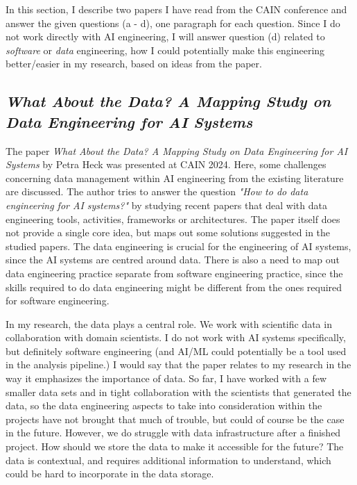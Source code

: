 \documentclass[11pt]{article}
\begin{document}
In this section, I describe two papers I have read from the CAIN conference and answer the given questions (a - d), one paragraph for each question. 
Since I do not work directly with AI engineering, I will answer question (d) related to \emph{software} or \emph{data} engineering, how I could potentially make this engineering better/easier in my research, based on ideas from the paper. 

\subsection{\textit{What About the Data? A Mapping Study on Data Engineering for AI Systems}}

The paper \textit{What About the Data? A Mapping Study on Data Engineering for AI Systems} by Petra Heck \cite{heck_what_about_the_data} was presented at CAIN 2024. Here, some challenges concerning data management within AI engineering from the existing literature are discussed. The author tries to answer the question \textit{"How to do data engineering for AI systems?"} by studying recent papers that deal with data engineering tools, activities, frameworks or architectures.
The paper itself does not provide a single core idea, but maps out some solutions suggested in the studied papers. 
The data engineering is crucial for the engineering of AI systems, since the AI systems are centred around data. 
There is also a need to map out data engineering practice separate from software engineering practice, since the skills required to do data engineering might be different from the ones required for software engineering.


In my research, the data plays a central role. We work with scientific data in collaboration with domain scientists. I do not work with AI systems specifically, but definitely software engineering (and AI/ML could potentially be a tool used in the analysis pipeline.)
I would say that the paper relates to my research in the way it emphasizes the importance of data. 
So far, I have worked with a few smaller data sets and in tight collaboration with the scientists that generated the data, so the data engineering aspects to take into consideration within the projects have not brought that much of trouble, but could of course be the case in the future. 
However, we do struggle with data infrastructure after a finished project. How should we store the data to make it accessible for the future? 
The data is contextual, and requires additional information to understand, which could be hard to incorporate in the data storage.
\end{document}
